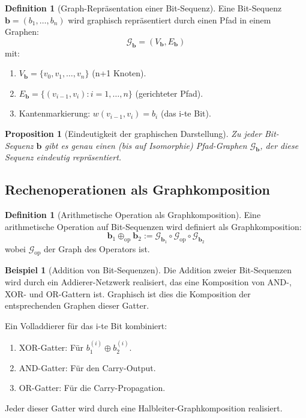\documentclass[12pt, a4paper]{article}
\newtheorem{proposition}[theorem]{Proposition}
\theoremstyle{definition}
\newtheorem{definition}[theorem]{Definition}
\newtheorem{example}[theorem]{Beispiel}
\theoremstyle{remark}
\newcommand{\Graph}{\mathcal{G}}
\begin{document}
\begin{definition}[Graph-Repräsentation einer Bit-Sequenz]
\label{def:graph_bit_sequenz}
Eine Bit-Sequenz $\mathbf{b} = (b_1, \ldots, b_n)$ wird graphisch repräsentiert durch einen Pfad in einem Graphen:
\[
  \Graph_{\mathbf{b}} = (V_{\mathbf{b}}, E_{\mathbf{b}})
\]
mit:
\begin{enumerate}[label=(\alph*)]
  \item $V_{\mathbf{b}} = \{v_0, v_1, \ldots, v_n\}$ (n+1 Knoten).
  \item $E_{\mathbf{b}} = \{(v_{i-1}, v_i) : i = 1, \ldots, n\}$ (gerichteter Pfad).
  \item Kantenmarkierung: $w(v_{i-1}, v_i) = b_i$ (das i-te Bit).
\end{enumerate}
\end{definition}

\begin{proposition}[Eindeutigkeit der graphischen Darstellung]
\label{prop:eindeutigkeit_bit_graph}
Zu jeder Bit-Sequenz $\mathbf{b}$ gibt es genau einen (bis auf Isomorphie) Pfad-Graphen $\Graph_{\mathbf{b}}$, der diese Sequenz eindeutig repräsentiert.
\end{proposition}

\subsection{Rechenoperationen als Graphkomposition}
\label{subsec:rechenoperationen}

\begin{definition}[Arithmetische Operation als Graphkomposition]
\label{def:operation_graphkomposition}
Eine arithmetische Operation auf Bit-Sequenzen wird definiert als Graphkomposition:
\[
  \mathbf{b}_1 \oplus_{\mathrm{op}} \mathbf{b}_2 := \Graph_{\mathbf{b}_1} \circ \Graph_{\mathrm{op}} \circ \Graph_{\mathbf{b}_2}
\]
wobei $\Graph_{\mathrm{op}}$ der Graph des Operators ist.
\end{definition}

\begin{example}[Addition von Bit-Sequenzen]
\label{ex:addition_bit_sequenzen}
Die Addition zweier Bit-Sequenzen wird durch ein Addierer-Netzwerk realisiert, das eine Komposition von AND-, XOR- und OR-Gattern ist. Graphisch ist dies die Komposition der entsprechenden Graphen dieser Gatter.

Ein Volladdierer für das i-te Bit kombiniert:
\begin{enumerate}[label=(\roman*)]
  \item XOR-Gatter: Für $b_1^{(i)} \oplus b_2^{(i)}$.
  \item AND-Gatter: Für den Carry-Output.
  \item OR-Gatter: Für die Carry-Propagation.
\end{enumerate}

Jeder dieser Gatter wird durch eine Halbleiter-Graphkomposition realisiert.
\end{example}
\end{document}
